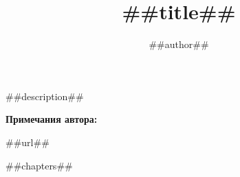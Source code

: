 \documentclass[twoside,a5paper,12pt]{extbook}
\title{##title##}
\author{##author##}
\date{}
\begin{document}
\maketitle


##description##

\vfill

\textbf{Примечания автора:}


\begin{flushright}##url##\end{flushright}


\tableofcontents
\thispagestyle{empty}


##chapters##
\end{document}
